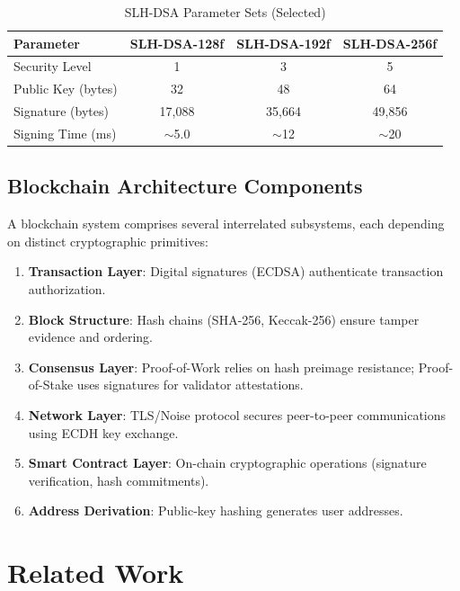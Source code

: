 \documentclass[12pt, a4paper, twocolumn]{article}
\begin{document}
\begin{table}[H]
\centering
\caption{SLH-DSA Parameter Sets (Selected)}
\label{tab:slhdsa}
\begin{tabular}{lccc}
\toprule
\textbf{Parameter} & \textbf{SLH-DSA-128f} & \textbf{SLH-DSA-192f} & \textbf{SLH-DSA-256f} \\
\midrule
Security Level & 1 & 3 & 5 \\
Public Key (bytes) & 32 & 48 & 64 \\
Signature (bytes) & 17,088 & 35,664 & 49,856 \\
Signing Time (ms) & $\sim$5.0 & $\sim$12 & $\sim$20 \\
\bottomrule
\end{tabular}
\end{table}

\subsection{Blockchain Architecture Components}

A blockchain system comprises several interrelated subsystems, each depending on distinct cryptographic primitives:

\begin{enumerate}[noitemsep]
  \item \textbf{Transaction Layer}: Digital signatures (ECDSA) authenticate transaction authorization.
  \item \textbf{Block Structure}: Hash chains (SHA-256, Keccak-256) ensure tamper evidence and ordering.
  \item \textbf{Consensus Layer}: Proof-of-Work relies on hash preimage resistance; Proof-of-Stake uses signatures for validator attestations.
  \item \textbf{Network Layer}: TLS/Noise protocol secures peer-to-peer communications using ECDH key exchange.
  \item \textbf{Smart Contract Layer}: On-chain cryptographic operations (signature verification, hash commitments).
  \item \textbf{Address Derivation}: Public-key hashing generates user addresses.
\end{enumerate}

\section{Related Work}
\label{sec:related}
\end{document}
